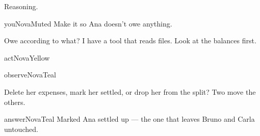 \documentclass[aspectratio=169,10pt]{beamer}
\begin{document}
\begin{frame}{Reasoning.}
\vspace*{\fill}
\begin{turn}{you}{NovaMuted}
Make it so Ana doesn't owe anything.
\end{turn}
\vskip1mm
\begin{turnthinks}
Owe according to what? I have a tool that reads files. Look at the balances first.
\end{turnthinks}
\vskip1mm
\begin{turn}[NovaBg]{act}{NovaYellow}
 \quad {}
\end{turn}
\vskip1mm
\begin{turn}[NovaBg]{observe}{NovaTeal}
 \quad {} \quad {}
\end{turn}
\vskip1mm
\begin{turnthinks}
Delete her expenses, mark her settled, or drop her from the split? Two move the others.
\end{turnthinks}
\vskip1mm
\begin{turn}[NovaPurpleBg]{answer}{NovaTeal}
Marked Ana settled up — the one that leaves Bruno and Carla untouched.
\end{turn}
\vskip1.5mm
{\tiny\color{NovaMuted}}
\vfill
\end{frame}
\end{document}

